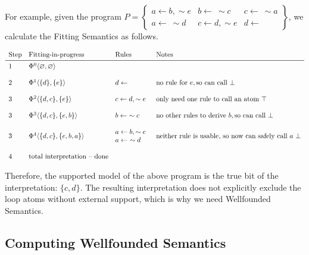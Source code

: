 \documentclass[9pt,a4paper,landscape]{article}
\begin{document}
{For example, given the program $P = \left\{\begin{array}{lll}
a \leftarrow b, \sim e & b \leftarrow\ \sim c & c \leftarrow\ \sim a \\
a \leftarrow\ \sim d & c \leftarrow d, \sim e & d \leftarrow
\end{array}\right\}$, we calculate the Fitting Semantics as follows.

\begin{center}
	$\begin{array}{llll}
\text{Step} & \text{Fitting-in-progress} & \text{Rules} & \text{Notes} \\ \midrule
1 & \Phi^0 \langle \varnothing, \varnothing \rangle && \\&\\
2 & \Phi^1 \langle \{d\}, \{e\} \rangle & d \leftarrow & \text{no rule for}\ e, \text{so can call}\ \bot\\&\\
3 & \Phi^2 \langle \{d, c\}, \{e\} \rangle & c \leftarrow d, \sim e & \text{only need one rule to call an atom}\ \top \\&\\
3 & \Phi^3 \langle \{d, c\}, \{e, b\} \rangle & b \leftarrow\ \sim c & \text{no other rules to derive}\ b, \text{so can call}\ \bot \\&\\
3 & \Phi^4 \langle \{d, c\}, \{e, b, a\} \rangle & \begin{array}{@{}l}
a \leftarrow b, \sim e\\
a \leftarrow\ \sim d
\end{array} & \text{neither rule is usable, so now can safely call}\ a\ \bot \\ &\\
4 & \text{total interpretation -- done}
\end{array}$
\end{center}

Therefore, the supported model of the above program is the true bit of the interpretation: $\{c, d\}$.
The resulting interpretation does not explicitly exclude the loop atoms without external support, which is why we need Wellfounded Semantics.


\subsection{Computing Wellfounded Semantics}
\label{subsec:wellf-sem}

}
\end{document}
